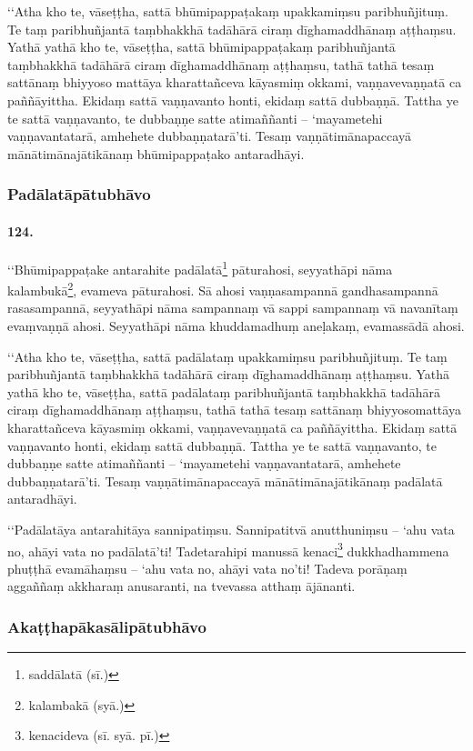 ‘‘Atha kho te, vāseṭṭha, sattā bhūmipappaṭakaṃ upakkamiṃsu paribhuñjituṃ. Te taṃ paribhuñjantā taṃbhakkhā tadāhārā ciraṃ dīghamaddhānaṃ aṭṭhaṃsu. Yathā yathā kho te, vāseṭṭha, sattā bhūmipappaṭakaṃ paribhuñjantā taṃbhakkhā tadāhārā ciraṃ dīghamaddhānaṃ aṭṭhaṃsu, tathā tathā tesaṃ sattānaṃ bhiyyoso mattāya kharattañceva kāyasmiṃ okkami, vaṇṇavevaṇṇatā ca paññāyittha. Ekidaṃ sattā vaṇṇavanto honti, ekidaṃ sattā dubbaṇṇā. Tattha ye te sattā vaṇṇavanto, te dubbaṇṇe satte atimaññanti – ‘mayametehi vaṇṇavantatarā, amhehete dubbaṇṇatarā’ti. Tesaṃ vaṇṇātimānapaccayā mānātimānajātikānaṃ bhūmipappaṭako antaradhāyi.

\subsubsection{Padālatāpātubhāvo}

\paragraph{124.} ‘‘Bhūmipappaṭake antarahite padālatā\footnote{saddālatā (sī.)} pāturahosi, seyyathāpi nāma kalambukā\footnote{kalambakā (syā.)}, evameva pāturahosi. Sā ahosi vaṇṇasampannā gandhasampannā rasasampannā, seyyathāpi nāma sampannaṃ vā sappi sampannaṃ vā navanītaṃ evaṃvaṇṇā ahosi. Seyyathāpi nāma khuddamadhuṃ aneḷakaṃ, evamassādā ahosi.

‘‘Atha kho te, vāseṭṭha, sattā padālataṃ upakkamiṃsu paribhuñjituṃ. Te taṃ paribhuñjantā taṃbhakkhā tadāhārā ciraṃ dīghamaddhānaṃ aṭṭhaṃsu. Yathā yathā kho te, vāseṭṭha, sattā padālataṃ paribhuñjantā taṃbhakkhā tadāhārā ciraṃ dīghamaddhānaṃ aṭṭhaṃsu, tathā tathā tesaṃ sattānaṃ bhiyyosomattāya kharattañceva kāyasmiṃ okkami, vaṇṇavevaṇṇatā ca paññāyittha. Ekidaṃ sattā vaṇṇavanto honti, ekidaṃ sattā dubbaṇṇā. Tattha ye te sattā vaṇṇavanto, te dubbaṇṇe satte atimaññanti – ‘mayametehi vaṇṇavantatarā, amhehete dubbaṇṇatarā’ti. Tesaṃ vaṇṇātimānapaccayā mānātimānajātikānaṃ padālatā antaradhāyi.

‘‘Padālatāya antarahitāya sannipatiṃsu. Sannipatitvā anutthuniṃsu – ‘ahu vata no, ahāyi vata no padālatā’ti! Tadetarahipi manussā kenaci\footnote{kenacideva (sī. syā. pī.)} dukkhadhammena phuṭṭhā evamāhaṃsu – ‘ahu vata no, ahāyi vata no’ti! Tadeva porāṇaṃ aggaññaṃ akkharaṃ anusaranti, na tvevassa atthaṃ ājānanti.

\subsubsection{Akaṭṭhapākasālipātubhāvo}

